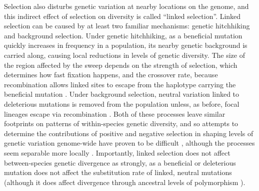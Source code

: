 Selection also disturbs genetic variation at nearby locations on the genome,
and this indirect effect of selection on diversity is called ``linked selection''.
Linked selection can be caused by at least two familiar mechanisms: genetic hitchhiking and background selection.
Under genetic hitchhiking, as a beneficial mutation quickly increases in frequency in a population,
its nearby genetic background is carried along, causing local reductions in levels of genetic diversity. 
The size of the region affected by the sweep depends on the strength of selection, which determines how fast fixation happens,
and the crossover rate, because recombination allows linked sites to escape from the haplotype carrying the beneficial mutation \parencite{maynard_smith_hitch-hiking_1974,kaplan_hitchhiking_1989}.
Under background selection, neutral variation linked to deleterious mutations is removed from the population
unless, as before, focal lineages escape via recombination \parencite{charlesworth_effect_1993}.
Both of these processes leave similar footprints on patterns of within-species genetic diversity,
and so attempts to determine the contributions of positive and negative selection in 
shaping levels of genetic variation genome-wide have proven to be difficult \parencite{kim_joint_2000, andolfatto_adaptive_2001},
although the processes seem separable more locally \parencite{schrider_soft_2017,schrider_background_2020}.
Importantly, linked selection does not affect between-species genetic divergence as strongly,
as a beneficial or deleterious mutation does not affect the substitution rate of linked, neutral mutations \citep{birky_effects_1988}
(although it does affect divergence through ancestral levels of polymorphism \citep{begun_population_2007, phung_determining_2016}).



